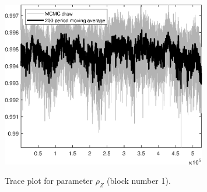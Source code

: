 \begin{figure}[H]
\centering
  \includegraphics[width=0.8\textwidth]{BRS_growth_KPR/graphs/TracePlot_rho_Z_blck_1}\\
    \caption{Trace plot for parameter ${\rho_Z}$ (block number 1).}
\end{figure}
